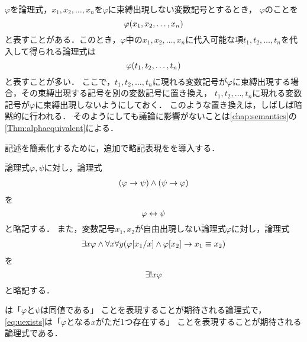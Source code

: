 
\begin{Note}
	\(\varphi\)を論理式，\(x_1, x_2, \dots, x_n\)を\(\varphi\)に束縛出現しない変数記号とするとき，
	\(\varphi\)のことを
	\begin{equation}
		\apply{\varphi}{x_1, x_2, \dots, x_n}
		\label{eq:freevariablefunction}
	\end{equation}
	と表すことがある．このとき，\(\varphi\)中の\(x_1, x_2, \dots, x_n\)に代入可能な項\(t_1, t_2, \dots, t_n\)を代入して得られる論理式は
	\begin{equation}
		\apply{\varphi}{t_1, t_2, \dots, t_n}
		\label{eq:freevariablefunctionsubstitution}
	\end{equation}
	と表すことが多い．
	ここで，\(t_1, t_2, \dots, t_n\)に現れる変数記号が\(\varphi\)に束縛出現する場合，その束縛出現する記号を別の変数記号に置き換え，
	\(t_1, t_2, \dots, t_n\)に現れる変数記号が\(\varphi\)に束縛出現しないようにしておく．
	このような置き換えは，しばしば暗黙的に行われる．
	そのようにしても議論に影響がないことは\cref{chap:semantics}の\cref{Thm:alphaequivalent}による．
\end{Note}

記述を簡素化するために，追加で略記表現をを導入する．

\begin{Def} \label{Def:AbbreviatioForFormula}
	論理式\(\varphi, \psi\)に対し，論理式
	\begin{align*}
		\paren{\varphi \to \psi} \land \paren{\psi \to \varphi}
	\end{align*}
	を
	\begin{equation}
		\varphi \leftrightarrow \psi
		\label{eq:formulaequiv}
	\end{equation}
	と略記する．
	また，変数記号\(x_1, x_2\)が自由出現しない論理式\(\varphi\)に対し，論理式
	\begin{align*}
		\exists x \varphi \land \forall x \forall y \paren{\subst{\varphi}{x_1/x} \land \subst{\varphi}{x_2} \to x_1 \objeq x_2}
	\end{align*}
	を
	\begin{equation}
		{\exists !} x \varphi
		\label{eq:uexists}
	\end{equation}
	と略記する．

	は「\(\varphi\)と\(\psi\)は同値である」
	ことを表現することが期待される論理式で，
	\cref{eq:uexists}は「\(\varphi\)となる\(x\)がただ1つ存在する」
	ことを表現することが期待される論理式である．
\end{Def}


